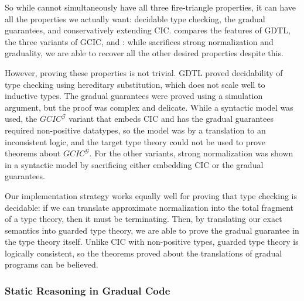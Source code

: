 So while \lang cannot simultaneously have all three fire-triangle properties,
it can have all the properties we actually want:
decidable type checking, the gradual guarantees, and conservatively extending CIC.
 compares the features of GDTL, the three variants of GCIC, and \lang:
while \lang sacrifices strong normalization and graduality, we are able to recover
all the other desired properties despite this.

However, proving these properties is not trivial.
GDTL proved decidability of type checking using hereditary substitution, which does not
scale well to inductive types.
The gradual guarantees were proved using a simulation argument, but the proof
was complex and delicate.
While a syntactic model was used, the $GCIC^{\mathcal{G}}$ variant that embeds CIC and has the gradual guarantees
required non-positive datatypes, so the model was by a translation to an inconsistent logic,
and the target type theory could not be used to prove theorems about $GCIC^{\mathcal{G}}$.
For the other variants, strong normalization was shown in a syntactic model by sacrificing either embedding CIC
or the gradual guarantees.

Our implementation strategy works equally well for proving that type checking is decidable:
if we can translate approximate normalization into the total fragment of a type theory,
then it must be terminating. Then, by translating our exact semantics into
guarded type theory, we are able to prove the gradual guarantee in the type theory itself.
Unlike CIC with non-positive types, guarded type theory is logically consistent, so
the theorems proved about the translations of gradual programs can be believed.


\subsubsection{Static Reasoning in Gradual Code}
\label{subsec:static-reason}

